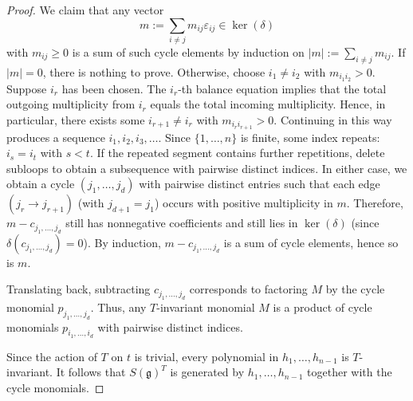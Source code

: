 \documentclass[10pt,a4paper]{amsart}
\begin{document}
\begin{proof}
We claim that any vector $$m := \sum_{i\neq j} m_{ij}\varepsilon_{ij}\in \ker(\delta)$$ with $m_{ij}\geq 0$ is a sum of such cycle elements by induction on $|m| := \sum_{i\neq j} m_{ij}$. If $|m| = 0$, there is nothing to prove. Otherwise, choose $i_1\neq i_2$ with $m_{i_1 i_2}>0$. Suppose $i_r$ has been chosen. The $i_r$-th balance equation implies that the total outgoing multiplicity from $i_r$ equals the total incoming multiplicity. Hence, in particular, there exists some $i_{r+1}\neq i_r$ with $m_{i_r i_{r+1}}>0$. Continuing in this way produces a sequence $i_1,i_2,i_3,\dots$. Since $\{1,\dots,n\}$ is finite, some index repeats: $i_s=i_t$ with $s<t$. If the repeated segment contains further repetitions, delete subloops to obtain a subsequence with pairwise distinct indices. In either case, we obtain a cycle $(j_1, \dots,j_d)$ with pairwise distinct entries such that each edge $(j_r \to j_{r+1})$ (with $j_{d+1} = j_1$) occurs with positive multiplicity in $m$. Therefore, $m - c_{j_1,\dots,j_d}$ still has nonnegative coefficients and still lies in $\ker (\delta)$ (since $\delta (c_{j_1,\dots, j_d})=0$). By induction, $m-c_{j_1,\dots,j_d}$ is a sum of cycle elements, hence so is $m$.

Translating back, subtracting $c_{j_1,\dots,j_d}$ corresponds to factoring $M$ by the cycle monomial $p_{j_1,\dots,j_d}$. Thus, any $T$-invariant monomial $M$ is a product of cycle monomials $p_{i_1,\dots,i_d}$ with pairwise distinct indices.

Since the action of $T$ on $t$ is trivial, every polynomial in $h_1,\dots,h_{n-1}$ is $T$-invariant. It follows that
$S(\mathfrak{g})^T$ is generated by $h_1,\dots,h_{n-1}$ together with the cycle monomials.
\end{proof}
\end{document}
